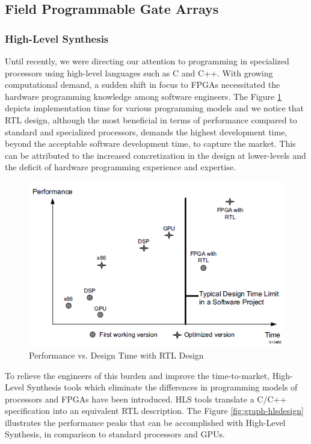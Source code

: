 \subsection{Field Programmable Gate Arrays}
\label{2_3_2}
\subsubsection{High-Level Synthesis}
\label{2_3_2_1}
Until recently, we were directing our attention to programming in specialized processors using high-level languages such as C and C++. With growing computational demand, a sudden shift in focus to FPGAs necessitated the hardware programming knowledge among software engineers. \newline \newline
The Figure \ref{fig:graph-rtldesign} depicts implementation time for various programming models and we notice that RTL design, although the most beneficial in terms of performance compared to standard and specialized processors, demands the highest development time, beyond the acceptable software development time, to capture the market. This can be attributed to the increased concretization in the design at lower-levels and the deficit of hardware programming experience and expertise.
\begin{figure}[h!]
  \centering
  \includegraphics[width=0.8\linewidth]{figures/graph-rtldesign.png}
  \caption{Performance vs. Design Time with RTL Design
  \cite{xil_hls}}
  \label{fig:graph-rtldesign}
\end{figure}
To relieve the engineers of this burden and improve the time-to-market, High-Level Synthesis tools which eliminate the differences in programming models of processors and FPGAs have been introduced. HLS tools translate a C/C++ specification into an equivalent RTL description. The Figure \ref{fig:graph-hlsdesign} illustrates the performance peaks that can be accomplished with High-Level Synthesis, in comparison to standard processors and GPUs. 
